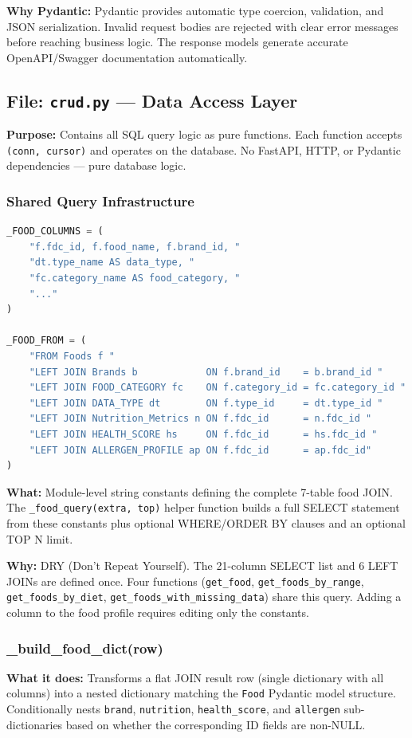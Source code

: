\documentclass[12pt,a4paper]{article}
\begin{document}
\textbf{Why Pydantic:} Pydantic provides automatic type coercion, validation, and JSON serialization. Invalid request bodies are rejected with clear error messages before reaching business logic. The response models generate accurate OpenAPI/Swagger documentation automatically.

\subsection{File: \texttt{crud.py} — Data Access Layer}

\textbf{Purpose:} Contains all SQL query logic as pure functions. Each function accepts \texttt{(conn, cursor)} and operates on the database. No FastAPI, HTTP, or Pydantic dependencies — pure database logic.

\subsubsection{Shared Query Infrastructure}

\begin{lstlisting}[language=Python, caption=Shared query constants]
_FOOD_COLUMNS = (
    "f.fdc_id, f.food_name, f.brand_id, "
    "dt.type_name AS data_type, "
    "fc.category_name AS food_category, "
    "..."
)

_FOOD_FROM = (
    "FROM Foods f "
    "LEFT JOIN Brands b            ON f.brand_id    = b.brand_id "
    "LEFT JOIN FOOD_CATEGORY fc    ON f.category_id = fc.category_id "
    "LEFT JOIN DATA_TYPE dt        ON f.type_id     = dt.type_id "
    "LEFT JOIN Nutrition_Metrics n ON f.fdc_id      = n.fdc_id "
    "LEFT JOIN HEALTH_SCORE hs     ON f.fdc_id      = hs.fdc_id "
    "LEFT JOIN ALLERGEN_PROFILE ap ON f.fdc_id      = ap.fdc_id"
)
\end{lstlisting}

\textbf{What:} Module-level string constants defining the complete 7-table food JOIN. The \texttt{\_food\_query(extra, top)} helper function builds a full SELECT statement from these constants plus optional WHERE/ORDER BY clauses and an optional TOP N limit.

\textbf{Why:} DRY (Don't Repeat Yourself). The 21-column SELECT list and 6 LEFT JOINs are defined once. Four functions (\texttt{get\_food}, \texttt{get\_foods\_by\_range}, \texttt{get\_foods\_by\_diet}, \texttt{get\_foods\_with\_missing\_data}) share this query. Adding a column to the food profile requires editing only the constants.

\subsubsection{\_build\_food\_dict(row)}
\textbf{What it does:} Transforms a flat JOIN result row (single dictionary with all columns) into a nested dictionary matching the \texttt{Food} Pydantic model structure. Conditionally nests \texttt{brand}, \texttt{nutrition}, \texttt{health\_score}, and \texttt{allergen} sub-dictionaries based on whether the corresponding ID fields are non-NULL.
\end{document}

